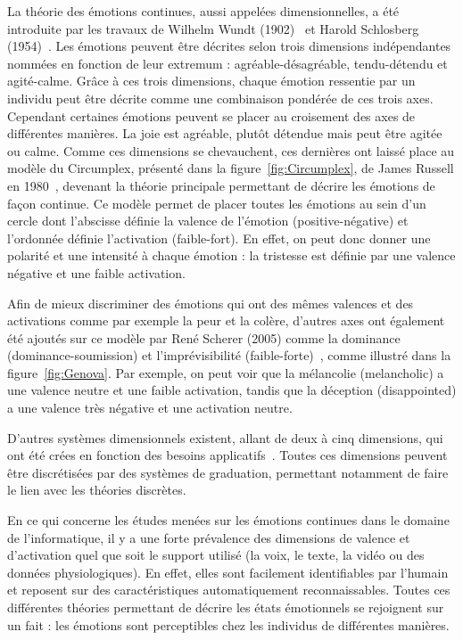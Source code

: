 

La théorie des émotions continues, aussi appelées dimensionnelles, a été introduite par les travaux de Wilhelm Wundt (1902)~\cite{Wundt1902} et Harold Schlosberg (1954)~\cite{Schlosberg1954}. Les émotions peuvent être décrites selon trois dimensions indépendantes nommées en fonction de leur extremum : agréable-désagréable, tendu-détendu et agité-calme. Grâce à ces trois dimensions, chaque émotion ressentie par un individu peut être décrite comme une combinaison pondérée de ces trois axes. Cependant certaines émotions peuvent se placer au croisement des axes de différentes manières. La joie est agréable, plutôt détendue mais peut être agitée ou calme. Comme ces dimensions se chevauchent, ces dernières ont laissé place au modèle du Circumplex, présenté dans la figure~\ref{fig:Circumplex}, de James Russell en 1980~\cite{Russell1980}, devenant la théorie principale permettant de décrire les émotions de façon continue. Ce modèle permet de placer toutes les émotions au sein d'un cercle dont l'abscisse définie la valence de l'émotion (positive-négative) et l'ordonnée définie l'activation (faible-fort). En effet, on peut donc donner une polarité et une intensité à chaque émotion : la tristesse est définie par une valence négative et une faible activation.

Afin de mieux discriminer des émotions qui ont des mêmes valences et des activations comme par exemple la peur et la colère, d'autres axes ont également été ajoutés sur ce modèle par René Scherer (2005) comme la dominance (dominance-soumission) et l'imprévisibilité (faible-forte)~\cite{Scherer2005}, comme illustré dans la figure~\ref{fig:Genova}. Par exemple, on peut voir que la mélancolie (melancholic) a une valence neutre et une faible activation, tandis que la déception (disappointed) a une valence très négative et une activation neutre.


D'autres systèmes dimensionnels existent, allant de deux à cinq dimensions, qui ont été crées en fonction des besoins applicatifs~\cite{Mehrabian1980,Cochrane2009}. Toutes ces dimensions peuvent être discrétisées par des systèmes de graduation, permettant notamment de faire le lien avec les théories discrètes.

En ce qui concerne les études menées sur les émotions continues dans le domaine de l'informatique, il y a une forte prévalence des dimensions de valence et d'activation quel que soit le support utilisé (la voix, le texte, la vidéo ou des données physiologiques). En effet, elles sont facilement identifiables par l'humain et reposent sur des caractéristiques automatiquement reconnaissables.
Toutes ces différentes théories permettant de décrire les états émotionnels se rejoignent sur un fait : les émotions sont perceptibles chez les individus de différentes manières.

